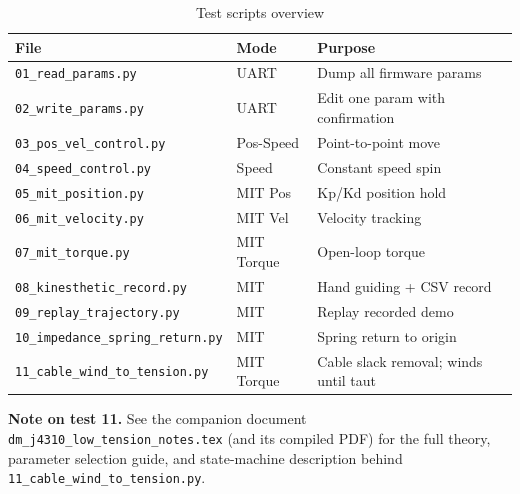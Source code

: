 \documentclass[11pt,a4paper]{article}
\begin{document}
\begin{table}[ht]\centering\small
\caption{Test scripts overview}\label{tab:test-scripts}
\begin{tabular}{lll}
\toprule
File & Mode & Purpose\\
\midrule
\texttt{01\_read\_params.py}  & UART & Dump all firmware params\\
\texttt{02\_write\_params.py} & UART & Edit one param with confirmation\\
\texttt{03\_pos\_vel\_control.py} & Pos-Speed & Point-to-point move\\
\texttt{04\_speed\_control.py}    & Speed     & Constant speed spin\\
\texttt{05\_mit\_position.py}     & MIT Pos   & Kp/Kd position hold\\
\texttt{06\_mit\_velocity.py}     & MIT Vel   & Velocity tracking\\
\texttt{07\_mit\_torque.py}       & MIT Torque & Open-loop torque\\
\texttt{08\_kinesthetic\_record.py}    & MIT & Hand guiding + CSV record\\
\texttt{09\_replay\_trajectory.py}     & MIT & Replay recorded demo\\
\texttt{10\_impedance\_spring\_return.py} & MIT & Spring return to origin\\
\texttt{11\_cable\_wind\_to\_tension.py} & MIT Torque & Cable slack removal; winds until taut\\
\bottomrule
\end{tabular}
\end{table}

\noindent\textbf{Note on test 11.}  See the companion document
\texttt{dm\_j4310\_low\_tension\_notes.tex} (and its compiled PDF) for the
full theory, parameter selection guide, and state-machine description
behind \texttt{11\_cable\_wind\_to\_tension.py}.
\end{document}
